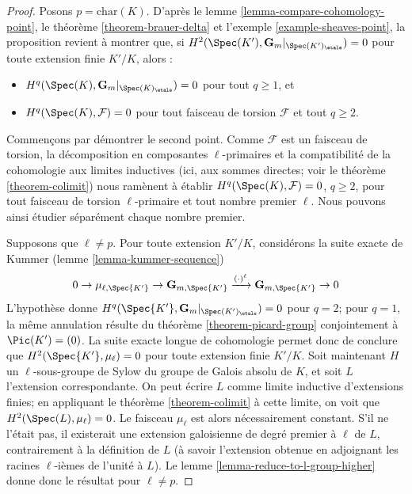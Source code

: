 \begin{proof}
Posons $p = \text{char}(K)$.
D'après le lemme \ref{lemma-compare-cohomology-point},
le théorème \ref{theorem-brauer-delta}
et l'exemple \ref{example-sheaves-point},
la proposition revient à montrer que, si
$H^2(\Spec(K'),\mathbf{G}_m|_{\Spec(K')_\etale}) = 0$
pour toute extension finie $K'/K$, alors :
\begin{itemize}
\item $H^q(\Spec(K),\mathbf{G}_m|_{\Spec(K)_\etale}) = 0$
pour tout $q \geq 1$, et
\item $H^q(\Spec(K),\mathcal{F}) = 0$
pour tout faisceau de torsion $\mathcal{F}$ et tout $q \geq 2$.
\end{itemize}
Commençons par démontrer le second point.
Comme $\mathcal{F}$ est un faisceau de torsion, la décomposition en
composantes $\ell$-primaires et la compatibilité de la cohomologie aux
limites inductives (ici, aux sommes directes; voir le théorème \ref{theorem-colimit})
nous ramènent à établir $H^q(\Spec(K),\mathcal{F}) = 0$, $q \geq 2$,
pour tout faisceau de torsion $\ell$-primaire et tout nombre premier $\ell$. Nous
pouvons ainsi étudier séparément chaque nombre premier.

\medskip\noindent
Supposons que $\ell \neq p$. Pour toute extension $K'/K$,
considérons la suite exacte de Kummer (lemme \ref{lemma-kummer-sequence})
$$
0 \to
\mu_{\ell, \Spec{K'}} \to
\mathbf{G}_{m, \Spec{K'}} \xrightarrow{(\cdot)^{\ell}}
\mathbf{G}_{m, \Spec{K'}} \to 0
$$
L'hypothèse donne $H^q(\Spec{K'},\mathbf{G}_m|_{\Spec(K')_\etale}) = 0$
pour $q = 2$; pour $q = 1$, la même annulation résulte du
théorème \ref{theorem-picard-group} conjointement à
$\Pic(K') = (0)$. La suite exacte longue de cohomologie
permet donc de conclure que $H^2(\Spec{K'}, \mu_\ell) = 0$ pour
toute extension finie $K'/K$. Soit maintenant $H$ un $\ell$-sous-groupe de Sylow
du groupe de Galois absolu de $K$, et soit $L$ l'extension
correspondante. On peut écrire $L$ comme limite inductive d'extensions finies;
en appliquant le théorème \ref{theorem-colimit} à cette limite, on voit que
$H^2(\Spec(L), \mu_\ell) = 0$.
Le faisceau $\mu_\ell$ est alors nécessairement constant. S'il ne l'était pas, il
existerait une extension galoisienne de degré premier à
$\ell$ de $L$, contrairement à la définition de $L$ (à savoir l'extension
obtenue en adjoignant les racines $\ell$-ièmes de l'unité à $L$).
Le lemme \ref{lemma-reduce-to-l-group-higher}
donne donc le résultat pour $\ell \neq p$.


\end{proof}
